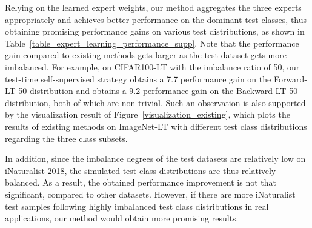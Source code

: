 \documentclass{article}
\begin{document}
 Relying on the learned expert weights, our method   aggregates the three experts appropriately and   achieves better performance on the  dominant test classes, thus obtaining    promising performance gains on various    test   distributions, as shown in Table~\ref{table_expert_learning_performance_supp}. Note that the performance gain  compared to existing methods gets larger as the test dataset gets more imbalanced. For example, on CIFAR100-LT with the imbalance ratio of 50, our test-time self-supervised   strategy  obtains a 7.7 performance gain   on the Forward-LT-50 distribution and obtains a 9.2 performance gain on the Backward-LT-50  distribution, both of which are non-trivial.  Such an observation   is also   supported by the visualization result  of  Figure~\ref{visualization_existing}, which plots the results of existing methods on ImageNet-LT with different test class distributions regarding the three class subsets. 

In addition, since the imbalance degrees of  the  test datasets are relatively low on  iNaturalist 2018,  the simulated test class distributions are thus relatively balanced. As a result, the obtained performance improvement is not that significant, compared to  other datasets. However, if there are   more iNaturalist test samples following highly imbalanced test class distributions   in real applications, our method would obtain more promising results.
\end{document}
